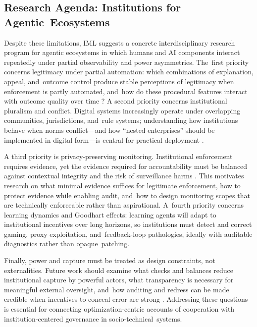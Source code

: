 \documentclass[mca,article,accept,pdftex,oneauthor]{Definitions/mdpi}
\begin{document}
\subsection{Research Agenda: Institutions for Agentic~Ecosystems}

Despite these limitations, IML suggests a concrete interdisciplinary research program for agentic ecosystems in which humans and AI components interact repeatedly under partial observability and power asymmetries. The~first priority concerns legitimacy under partial automation: which combinations of explanation, appeal, and~outcome control produce stable perceptions of legitimacy when enforcement is partly automated, and~how do these procedural features interact with outcome quality over time \citep{Tyler1990,Lee2019ProceduralJustice}? A second priority concerns institutional pluralism and conflict. Digital systems increasingly operate under overlapping communities, jurisdictions, and~rule systems; understanding how institutions behave when norms conflict---and how ``nested enterprises'' should be implemented in digital form---is central for practical deployment \citep{Ostrom1990}.

A third priority is privacy-preserving monitoring. Institutional enforcement requires evidence, yet the evidence required for accountability must be balanced against contextual integrity and the risk of surveillance harms \citep{Nissenbaum2004,Lyon2007Surveillance}. This motivates research on what minimal evidence suffices for legitimate enforcement, how to protect evidence while enabling audit, and~how to design monitoring scopes that are technically enforceable rather than aspirational. A~fourth priority concerns learning dynamics and Goodhart effects: learning agents will adapt to institutional incentives over long horizons, so institutions must detect and correct gaming, proxy exploitation, and~feedback-loop pathologies, ideally with auditable diagnostics rather than opaque~patching.

Finally, power and capture must be treated as design constraints, not externalities. Future work should examine what checks and balances reduce institutional capture by powerful actors, what transparency is necessary for meaningful external oversight, and~how auditing and redress can be made credible when incentives to conceal error are strong \citep{Raji2020Auditing}. Addressing these questions is essential for connecting optimization-centric accounts of cooperation with institution-centered governance in socio-technical~systems.
\end{document}
